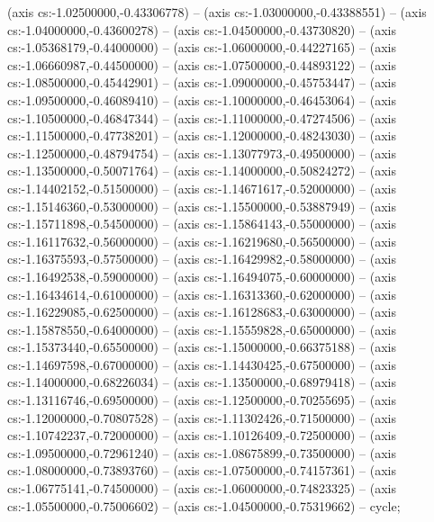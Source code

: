 (axis cs:-1.02500000,-0.43306778) -- (axis cs:-1.03000000,-0.43388551) -- (axis cs:-1.04000000,-0.43600278) -- (axis cs:-1.04500000,-0.43730820) -- (axis cs:-1.05368179,-0.44000000) -- (axis cs:-1.06000000,-0.44227165) -- (axis cs:-1.06660987,-0.44500000) -- (axis cs:-1.07500000,-0.44893122) -- (axis cs:-1.08500000,-0.45442901) -- (axis cs:-1.09000000,-0.45753447) -- (axis cs:-1.09500000,-0.46089410) -- (axis cs:-1.10000000,-0.46453064) -- (axis cs:-1.10500000,-0.46847344) -- (axis cs:-1.11000000,-0.47274506) -- (axis cs:-1.11500000,-0.47738201) -- (axis cs:-1.12000000,-0.48243030) -- (axis cs:-1.12500000,-0.48794754) -- (axis cs:-1.13077973,-0.49500000) -- (axis cs:-1.13500000,-0.50071764) -- (axis cs:-1.14000000,-0.50824272) -- (axis cs:-1.14402152,-0.51500000) -- (axis cs:-1.14671617,-0.52000000) -- (axis cs:-1.15146360,-0.53000000) -- (axis cs:-1.15500000,-0.53887949) -- (axis cs:-1.15711898,-0.54500000) -- (axis cs:-1.15864143,-0.55000000) -- (axis cs:-1.16117632,-0.56000000) -- (axis cs:-1.16219680,-0.56500000) -- (axis cs:-1.16375593,-0.57500000) -- (axis cs:-1.16429982,-0.58000000) -- (axis cs:-1.16492538,-0.59000000) -- (axis cs:-1.16494075,-0.60000000) -- (axis cs:-1.16434614,-0.61000000) -- (axis cs:-1.16313360,-0.62000000) -- (axis cs:-1.16229085,-0.62500000) -- (axis cs:-1.16128683,-0.63000000) -- (axis cs:-1.15878550,-0.64000000) -- (axis cs:-1.15559828,-0.65000000) -- (axis cs:-1.15373440,-0.65500000) -- (axis cs:-1.15000000,-0.66375188) -- (axis cs:-1.14697598,-0.67000000) -- (axis cs:-1.14430425,-0.67500000) -- (axis cs:-1.14000000,-0.68226034) -- (axis cs:-1.13500000,-0.68979418) -- (axis cs:-1.13116746,-0.69500000) -- (axis cs:-1.12500000,-0.70255695) -- (axis cs:-1.12000000,-0.70807528) -- (axis cs:-1.11302426,-0.71500000) -- (axis cs:-1.10742237,-0.72000000) -- (axis cs:-1.10126409,-0.72500000) -- (axis cs:-1.09500000,-0.72961240) -- (axis cs:-1.08675899,-0.73500000) -- (axis cs:-1.08000000,-0.73893760) -- (axis cs:-1.07500000,-0.74157361) -- (axis cs:-1.06775141,-0.74500000) -- (axis cs:-1.06000000,-0.74823325) -- (axis cs:-1.05500000,-0.75006602) -- (axis cs:-1.04500000,-0.75319662) -- cycle;
